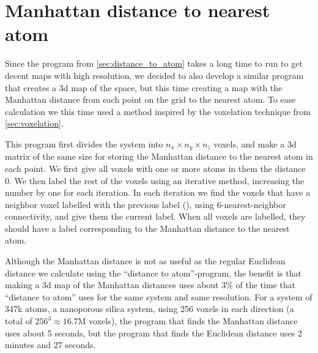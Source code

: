 \section{Manhattan distance to nearest atom\label{sec:generation_matrix}}
Since the program from \cref{sec:distance_to_atom} takes a long time to run to get decent maps with high resolution, we decided to also develop a similar program that creates a 3d map of the space, but this time creating a map with the Manhattan distance from each point on the grid to the nearest atom. To ease calculation we this time used a method inspired by the voxelation technique from \cref{sec:voxelation}. 

This program first divides the system into $n_x\times n_y\times n_z$ voxels, and make a 3d matrix of the same size for storing the Manhattan distance to the nearest atom in each point. We first give all voxels with one or more atoms in them the distance 0. We then label the rest of the voxels using an iterative method, increasing the number by one for each iteration. In each iteration we find the voxels that have a neighbor voxel labelled with the previous label (), using 6-nearest-neighbor connectivity, and give them the current label. When all voxels are labelled, they should have a label corresponding to the Manhattan distance to the nearest atom.

Although the Manhattan distance is not as useful as the regular Euclidean distance we calculate using the ``distance to atom''-program, the benefit is that making a 3d map of the Manhattan distances uses about 3\% of the time that ``distance to atom'' uses for the same system and same resolution. For a system of 347k atoms, a nanoporous silica system, using 256 voxels in each direction (a total of $256^3 \approx 16.7\text{M}$ voxels), the program that finds the Manhattan distance uses about 5 seconds, but the program that finds the Euclidean distance uses 2 minutes and 27 seconds.


